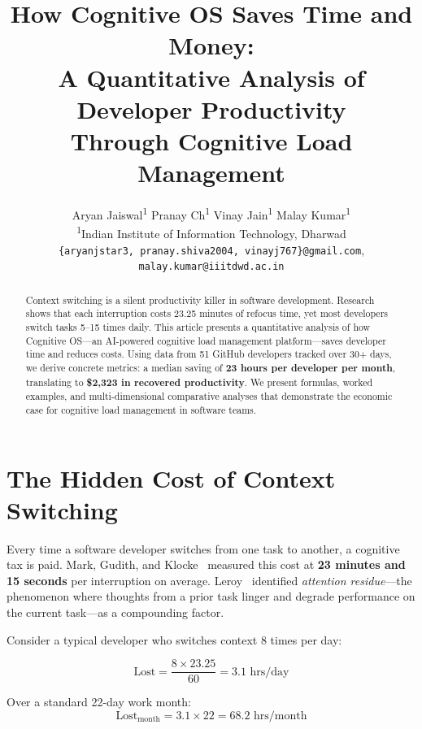 \documentclass[11pt, twocolumn]{article}
\title{\textbf{How Cognitive OS Saves Time and Money:\\A Quantitative Analysis of Developer Productivity\\Through Cognitive Load Management}}
\author{
Aryan Jaiswal\textsuperscript{1} \quad
Pranay Ch\textsuperscript{1} \quad
Vinay Jain\textsuperscript{1} \quad
Malay Kumar\textsuperscript{1}\\[4pt]
\textsuperscript{1}Indian Institute of Information Technology, Dharwad\\
\texttt{\{aryanjstar3, pranay.shiva2004, vinayj767\}@gmail.com},
\texttt{malay.kumar@iiitdwd.ac.in}
}
\date{}
\begin{document}
\maketitle
\thispagestyle{fancy}

\begin{abstract}
\noindent Context switching is a silent productivity killer in software development. Research shows that each interruption costs 23.25 minutes of refocus time, yet most developers switch tasks 5--15 times daily. This article presents a quantitative analysis of how Cognitive OS---an AI-powered cognitive load management platform---saves developer time and reduces costs. Using data from 51 GitHub developers tracked over 30+ days, we derive concrete metrics: a median saving of \textbf{23 hours per developer per month}, translating to \textbf{\$2,323 in recovered productivity}. We present formulas, worked examples, and multi-dimensional comparative analyses that demonstrate the economic case for cognitive load management in software teams.
\end{abstract}

\section{The Hidden Cost of Context Switching}

Every time a software developer switches from one task to another, a cognitive tax is paid. Mark, Gudith, and Klocke~\cite{mark2008cost} measured this cost at \textbf{23 minutes and 15 seconds} per interruption on average. Leroy~\cite{leroy2009why} identified \emph{attention residue}---the phenomenon where thoughts from a prior task linger and degrade performance on the current task---as a compounding factor.

Consider a typical developer who switches context 8 times per day:

\begin{equation}
\text{Lost} = \frac{8 \times 23.25}{60} = 3.1 \text{ hrs/day}
\label{eq:daily_loss}
\end{equation}

Over a standard 22-day work month:
\begin{equation}
\text{Lost}_{\text{month}} = 3.1 \times 22 = 68.2 \text{ hrs/month}
\label{eq:monthly_loss}
\end{equation}
\end{document}
